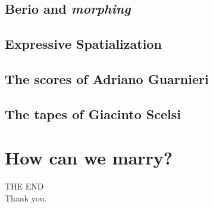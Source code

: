 \documentclass[\printmode,compress]{beamer}
\begin{document}
\subsection[Morphing]{Berio and {\it morphing}}



\subsection[Spatialization]{Expressive Spatialization}



\subsection[Guarnieri]{The scores of Adriano Guarnieri}



\subsection[Scelsi]{The tapes of Giacinto Scelsi}



\section[How]{How can we marry?}



\begin{frame}
    \begin{center}
				{\Huge \alert{THE END}}\\[2\baselineskip]
				\alert{Thank you.}
    \end{center}
\end{frame}
\end{document}
